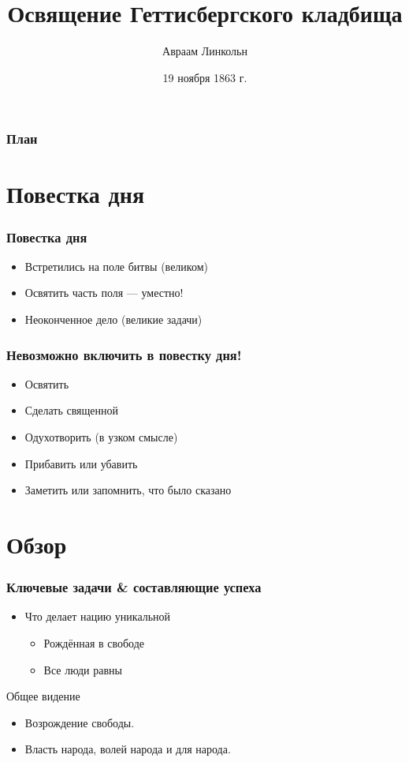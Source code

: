 \documentclass{beamer}
\title{Освящение Геттисбергского кладбища}
\author{Авраам Линкольн}
\institute[США]{Соединённые Штаты Америки}
\date{19 ноября 1863 г.}
\begin{document}
\begin{frame}
  \titlepage
\end{frame}

\begin{frame}
\frametitle{План}
  \tableofcontents
\end{frame}

\section{Повестка дня}

\begin{frame}
\frametitle{Повестка дня}
\begin{itemize}
  \item Встретились на поле битвы (великом)
  \item Освятить часть поля --- уместно!
  \item Неоконченное дело (великие задачи)
\end{itemize}
\end{frame}

\begin{frame}
\frametitle{Невозможно включить в повестку дня!}
\begin{itemize}[<+->]
  \item Освятить
  \item Сделать священной
  \item Одухотворить (в узком смысле)
  \item Прибавить или убавить
  \item Заметить или запомнить, что было сказано
\end{itemize}
\end{frame}

\section{Обзор}

\begin{frame}
\frametitle{Ключевые задачи \& составляющие успеха}
\begin{itemize}
\item Что делает нацию уникальной
  \begin{itemize}
    \item Рождённая в свободе
    \item Все люди равны
  \end{itemize}
\end{itemize}

\begin{block}{Общее видение}
\begin{itemize}
\item Возрождение свободы.
\item Власть народа, волей народа и для народа.
\end{itemize}
\end{block}
\end{frame}
\end{document}

